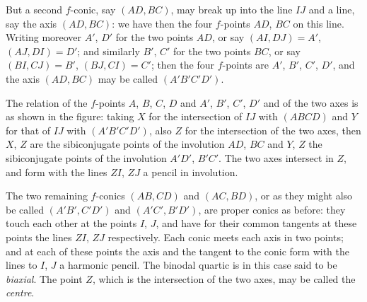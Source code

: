 \documentclass[11pt,a4paper]{article}
\begin{document}
But a second $f$-conic, say $(AD, BC)$, may break up into the line $IJ$ and a line, say the axis $(AD, BC)$: we have then the four $f$-points $AD$, $BC$ on this line. Writing moreover $A'$, $D'$ for the two points $AD$, or say $(AI, DJ) = A'$, $(AJ, DI) = D'$; and similarly $B'$, $C'$ for the two points $BC$, or say $(BI, CJ) = B'$, $(BJ, CI) = C'$; then the four $f$-points are $A'$, $B'$, $C'$, $D'$, and the axis $(AD, BC)$ may be called $(A'B'C'D')$.

The relation of the $f$-points $A$, $B$, $C$, $D$ and $A'$, $B'$, $C'$, $D'$ and of the two axes is as shown in the figure: taking $X$ for the intersection of $IJ$ with $(ABCD)$ and $Y$ for that of $IJ$ with $(A'B'C'D')$, also $Z$ for the intersection of the two axes, then $X$, $Z$ are the sibiconjugate points of the involution $AD$, $BC$ and $Y$, $Z$ the sibiconjugate points of the involution $A'D'$, $B'C'$. The two axes intersect in $Z$, and form with the lines $ZI$, $ZJ$ a pencil in involution.

The two remaining $f$-conics $(AB, CD)$ and $(AC, BD)$, or as they might also be called $(A'B', C'D')$ and $(A'C', B'D')$, are proper conics as before: they touch each other at the points $I$, $J$, and have for their common tangents at these points the lines $ZI$, $ZJ$ respectively. Each conic meets each axis in two points; and at each of these points the axis and the tangent to the conic form with the lines to $I$, $J$ a harmonic pencil. The binodal quartic is in this case said to be \emph{biaxial}. The point $Z$, which is the intersection of the two axes, may be called the \emph{centre}.
\end{document}
